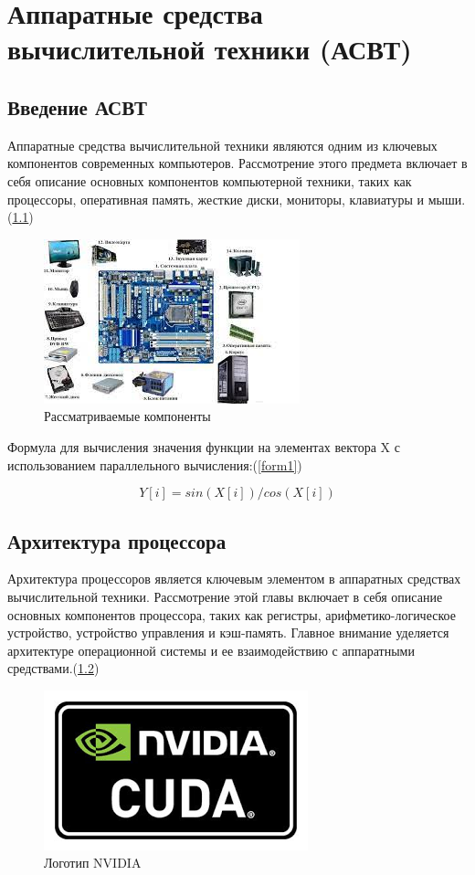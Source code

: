 \documentclass[a4paper, 14pt]{report}
\begin{document}
	\chapter{Аппаратные средства вычислительной техники (АСВТ)}
	\section{Введение АСВТ}
	Аппаратные средства вычислительной техники являются одним из ключевых компонентов современных компьютеров. Рассмотрение этого предмета включает в себя описание основных компонентов компьютерной техники, таких как процессоры, оперативная память, жесткие диски, мониторы, клавиатуры и мыши.(\ref{cuda1})
	
	\begin{figure}[h]
		\centering
		\includegraphics[scale=0.7]{cudaOne}
		\caption{Рассматриваемые компоненты}
		\label{cuda1}
	\end{figure}
	
	Формула для вычисления значения функции на элементах вектора X с использованием параллельного вычисления:(\ref{form1})
	
	\begin{equation}
		Y[i] = sin(X[i]) / cos(X[i])
		\label{form1}
	\end{equation}
	
	\section{Архитектура процессора}
	Архитектура процессоров является ключевым элементом в аппаратных средствах вычислительной техники. Рассмотрение этой главы включает в себя описание основных компонентов процессора, таких как регистры, арифметико-логическое устройство, устройство управления и кэш-память. Главное внимание уделяется архитектуре операционной системы и ее взаимодействию с аппаратными средствами.(\ref{cuda2})
	
	\begin{figure}[h]
		\centering
		\includegraphics[scale=0.7]{cuda.png}
		\caption{Логотип NVIDIA}
		\label{cuda2}
	\end{figure}
	
\end{document}
